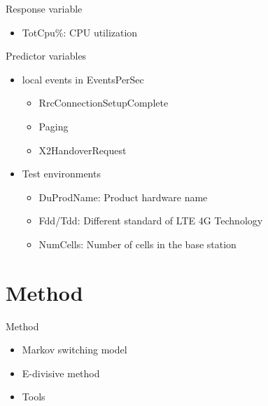 \documentclass{beamer}
\begin{document}
%

\begin{frame}
Response variable 
\begin{itemize}
\item TotCpu\%: CPU utilization
\end{itemize}	
\vspace{1em}
Predictor variables
\begin{itemize}
\item local events in EventsPerSec
\begin{itemize}
\item RrcConnectionSetupComplete
\item Paging
\item X2HandoverRequest
\end{itemize}	
\item Test environments
\begin{itemize}
\item DuProdName: Product hardware name
\item Fdd/Tdd: Different standard of LTE 4G Technology
\item NumCells: Number of cells in the base station
\end{itemize}
\end{itemize}

\end{frame}

\section{Method} 
\begin{frame}
Method 
\begin{itemize}
\item Markov switching model
\item E-divisive method
\item Tools
\end{itemize}
\end{frame}
\end{document}
